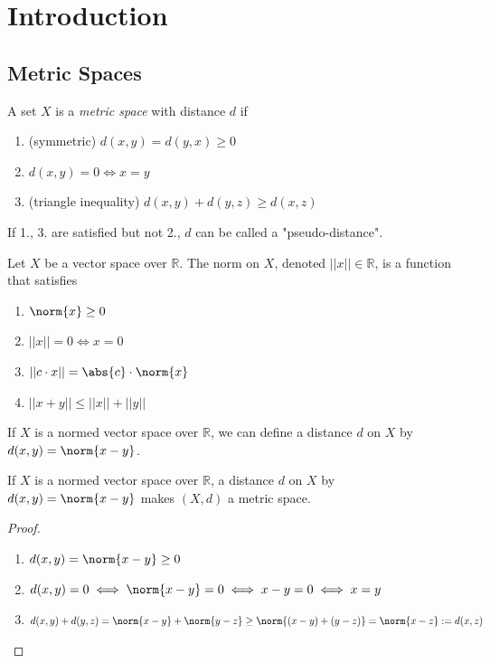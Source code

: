 \section{Introduction}
\subsection{Metric Spaces}

\begin{definition}
    A set $X$ is a \emph{metric space} with distance $d$ if 
    \begin{enumerate}
        \item (symmetric) $d(x, y) = d(y, x) \geq 0$
        \item $d(x, y) = 0 \iff x = y$
        \item (triangle inequality) $d(x,y) + d(y, z) \geq d(x, z)$
    \end{enumerate}
\end{definition}

\begin{remark}
    If 1., 3. are satisfied but not 2., $d$ can be called a "pseudo-distance".
\end{remark}

\begin{definition}
    Let $X$ be a vector space over $\mathbb{R}$. The norm on $X$, denoted $||x|| \in \mathbb{R}$, is a function that satisfies 
    \begin{enumerate}
        \item $\norm{x} \geq 0$
        \item $||x|| = 0 \iff x = 0$
        \item $||c \cdot x|| = \abs{c} \cdot \norm{x}$
        \item $||x+y|| \leq ||x|| + ||y||$
    \end{enumerate}
    If $X$ is a normed vector space over $\mathbb{R}$, we can define a distance $d$ on $X$ by $d(x,y) = \norm{x - y}$.
\end{definition}

\begin{proposition}
    If $X$ is a normed vector space over $\mathbb{R}$, a distance $d$ on $X$ by $d(x,y) = \norm{x - y}$ makes $(X, d)$ a metric space.
\end{proposition}

\begin{proof}
    \begin{enumerate}
        \item $d(x,y) = \norm{x - y} \geq 0$
        \item $d(x, y) = 0 \iff \norm{x - y} = 0 \iff x - y = 0 \iff x = y$
        \item $d(x, y) + d(y, z) = \norm{x - y} + \norm{y - z} \geq \norm{(x - y) + (y-z)} = \norm{x - z} := d(x, z)$
    \end{enumerate}
\end{proof}


